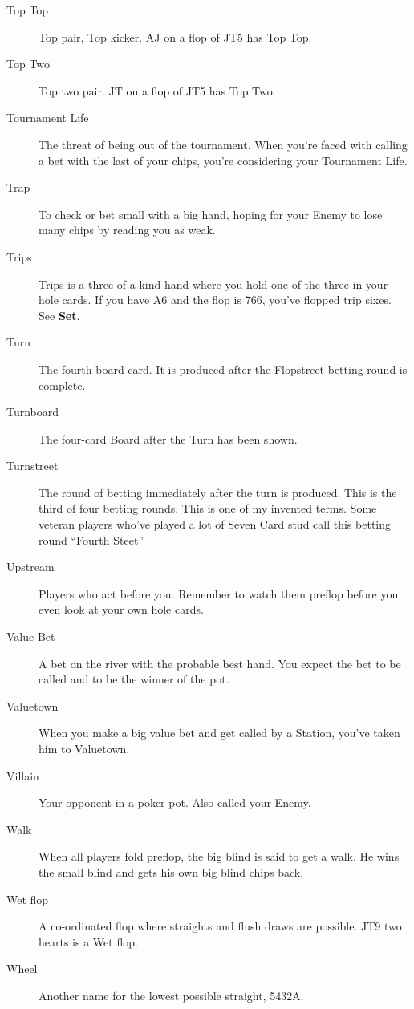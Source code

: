 \begin{description}
\item[Top Top] Top pair, Top kicker. AJ on a flop of JT5 has Top Top.

\item[Top Two] Top two pair. JT on a flop of JT5 has Top Two.

\item[Tournament Life] The threat of being out of the tournament. When
you're faced with calling a bet with the last of your chips, you're
considering your Tournament Life.

\item[Trap] To check or bet small with a big hand, hoping for your Enemy
to lose many chips by reading you as weak.

\item[Trips] Trips is a three of a kind hand where you hold one of the
three in your hole cards. If you have A6 and the flop is 766, you've
flopped trip sixes. See \textbf{Set}.

\item[Turn] The fourth board card. It is produced after the Flopstreet
betting round is complete.

\item[Turnboard] The four-card Board after the Turn has been shown.

\item[Turnstreet] The round of betting immediately after the turn is
produced. This is the third of four betting rounds. This is one
of my invented terms. Some veteran players who've played a lot of
Seven Card stud call this betting round ``Fourth Steet''

\item[Upstream] Players who act before you. Remember to watch them
preflop before you even look at your own hole cards.

\item[Value Bet] A bet on the river with the probable best hand. You
expect the bet to be called and to be the winner of the pot.

\item[Valuetown] When you make a big value bet and get called by
a Station, you've taken him to Valuetown.

\item[Villain] Your opponent in a poker pot. Also called your Enemy.

\item[Walk] When all players fold preflop, the big blind is said to
get a walk. He wins the small blind and gets his own big blind chips
back.

\item[Wet flop] A co-ordinated flop where straights and flush draws
are possible. JT9 two hearts is a Wet flop.

\item[Wheel] Another name for the lowest possible straight, 5432A.

\end{description}
